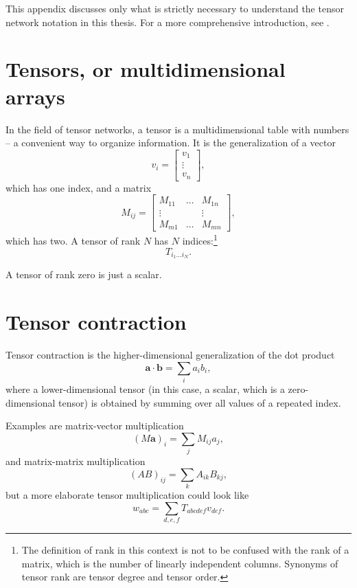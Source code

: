 This appendix discusses only what is strictly necessary to understand the tensor network notation in this thesis.
For a more comprehensive introduction, see \cite{orus2014practical}.

\section{Tensors, or multidimensional arrays}
In the field of tensor networks, a tensor is a multidimensional table with numbers -- a
convenient way to organize information. It is the generalization of a vector
\begin{equation}
  v_i =
  \begin{bmatrix}
    v_1 \\
    \vdots \\
    v_n
  \end{bmatrix},
\end{equation}
which has one index, and a matrix
\begin{equation}
  M_{i j} =
  \begin{bmatrix}
  M_{1 1} & \dots & M_{1 n} \\
  \vdots  & & \vdots \\
  M_{m 1} & \dots & M_{m n}
  \end{bmatrix},
\end{equation}
which has two.
A tensor of rank $N$ has $N$ indices:\footnote{The definition of rank in this
context is not to be confused with the rank of a matrix, which is the number of
linearly independent columns. Synonyms of tensor rank are tensor degree and
tensor order.}
\begin{equation}
  T_{i_1 \dots i_N}.
\end{equation}

A tensor of rank zero is just a scalar.

\section{Tensor contraction}

Tensor contraction is the higher-dimensional generalization of the dot product
\begin{equation}
  \bm{a} \cdot \bm{b} = \sum_i a_i b_i,
\end{equation}
where a lower-dimensional tensor (in this case, a scalar, which is a
zero-dimensional tensor) is obtained by summing over all values of a repeated
index.

Examples are matrix-vector multiplication
\begin{equation}
  (M \bm{a})_{i} = \sum_j M_{i j} a_j,
\end{equation}
and matrix-matrix multiplication
\begin{equation}
  (A B)_{i j} = \sum_k A_{i k} B_{k j},
\end{equation}
but a more elaborate tensor multiplication could look like
\begin{equation}
  w_{a b c} = \sum_{d, e, f} T_{a b c d e f} v_{d e f}.
\end{equation}

